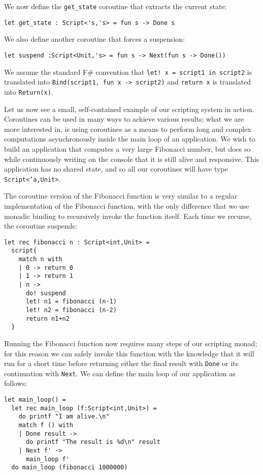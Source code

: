 We now define the \texttt{get\_state} coroutine that extracts the current state:

\begin{lstlisting}
let get_state : Script<'s,'s> = fun s -> Done s
\end{lstlisting}

We also define another coroutine that forces a suspension:

\begin{lstlisting}
let suspend :Script<Unit,'s> = fun s -> Next(fun s -> Done())
\end{lstlisting}

We assume the standard F\# convention that \texttt{let! x = script1 in script2} is translated into \texttt{Bind(script1, fun x -> script2)} and \texttt{return x} is translated into \texttt{Return(x)}.

Let us now see a small, self-contained example of our scripting system in action. Coroutines can be used in many ways to achieve various results; what we are more interested in, is using coroutines as a means to perform long and complex computations asynchronously inside the main loop of an application. We wish to build an application that computes a very large Fibonacci number, but does so while continuously writing on the console that it is still alive and responsive. This application has no shared state, and so all our coroutines will have type \texttt{Script<'a,Unit>}.

The coroutine version of the Fibonacci function is very similar to a regular implementation of the Fibonacci function, with the only difference that we use monadic binding to recursively invoke the function itself. Each time we recurse, the coroutine suspends:

\begin{lstlisting}
let rec fibonacci n : Script<int,Unit> = 
  script{
    match n with
    | 0 -> return 0
    | 1 -> return 1
    | n -> 
      do! suspend
      let! n1 = fibonacci (n-1)
      let! n2 = fibonacci (n-2)
      return n1+n2 
  }
\end{lstlisting}

Running the Fibonacci function now requires many steps of our scripting monad; for this reason we can safely invoke this function with the knowledge that it will run for a short time before returning either the final result with \texttt{Done} or its continuation with \texttt{Next}. We can define the main loop of our application as follows:

\begin{lstlisting}
let main_loop() =
  let rec main_loop (f:Script<int,Unit>) = 
    do printf "I am alive.\n"
    match f () with
    | Done result -> 
      do printf "The result is %d\n" result
    | Next f' ->
      main_loop f'
  do main_loop (fibonacci 1000000) 
\end{lstlisting}

